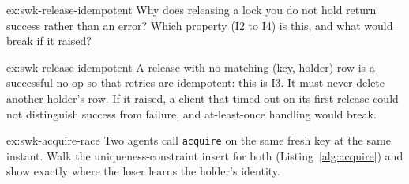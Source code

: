 \documentclass[11pt,a4paper]{article}
\theoremstyle{definition}
\theoremstyle{remark}
\begin{document}
\begin{pdexercise}[kind=Check,rating=1]{ex:swk-release-idempotent}
Why does releasing a lock you do not hold return success rather than an error? Which property (I2 to I4) is this, and what would break if it raised?
\end{pdexercise}
\begin{pdsolution}{ex:swk-release-idempotent}
A release with no matching (key, holder) row is a successful no-op so that retries are idempotent: this is I3. It must never delete another holder's row. If it raised, a client that timed out on its first release could not distinguish success from failure, and at-least-once handling would break.
\end{pdsolution}
\begin{pdexercise}[kind=Trace,rating=2]{ex:swk-acquire-race}
Two agents call \texttt{acquire} on the same fresh key at the same instant. Walk the uniqueness-constraint insert for both (Listing~\ref{alg:acquire}) and show exactly where the loser learns the holder's identity.
\end{pdexercise}
\end{document}
